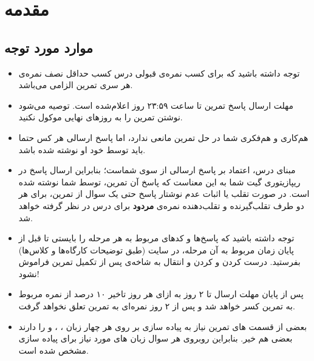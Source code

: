 \section{مقدمه}
    
    \subsection{موارد مورد توجه}
    
    \begin{itemize}
        \item
        توجه داشته باشید که برای کسب نمره‌ی قبولی درس کسب حداقل نصف نمره‌ی هر سری تمرین الزامی می‌باشد.
        \item 
        مهلت ارسال پاسخ تمرین تا ساعت ۲۳:۵۹ روز اعلام‌شده است. توصیه می‌شود نوشتن تمرین را به روزهای نهایی موکول نکنید.
        \item
        هم‌کاری و هم‌فکری شما در حل تمرین مانعی ندارد، اما پاسخ ارسالی هر کس حتما باید توسط خود او نوشته شده باشد.
        \item
        مبنای درس، اعتماد بر پاسخ ارسالی از سوی شماست؛ بنابراین ارسال پاسخ در ریپازیتوری گیت شما به این معناست که پاسخ آن تمرین، توسط شما نوشته شده است. در صورت تقلب یا اثبات عدم نوشتار پاسخ حتی یک سوال از تمرین، برای هر دو طرف تقلب‌گیرنده و تقلب‌دهنده نمره‌ی 
        \textbf{مردود}
         برای درس در نظر گرفته خواهد شد.
        \item
        توجه داشته باشید که پاسخ‌ها و کدهای مربوط به هر مرحله را بایستی تا قبل از پایان زمان مربوط به آن مرحله، در سایت
        \href{https://dev.azure.com}{}
        (طبق توضیحات کارگاه‌ها و کلاس‌ها) بفرستید.
        درست کردن  
        و 
        کردن 
        و انتقال به شاخه‌ی 
        پس از تکمیل تمرین فراموش نشود!
        
        
        \item
        پس از پایان مهلت ارسال تا ۲ روز به ازای هر روز تاخیر ۱۰ درصد از نمره مربوط به تمرین کسر خواهد شد و پس از ۲ روز نمره‌ای به تمرین تعلق نخواهد گرفت.
        
        \item
        بعضی از قسمت های تمرین نیاز به پیاده سازی بر روی هر چهار زبان
        \grayBox{\textcolor{purple}{C\#}}
        ،
        \grayBox{\textcolor{red}{Python}}
        ،
        \grayBox{\textcolor{orange}{C++}}
        و
        \grayBox{\textcolor{green}{Java}}
        را دارند بعضی هم خیر.
        بنابراین روبروی هر سوال زبان های مورد نیاز برای پیاده سازی مشخص شده است.
        
    
    \end{itemize}
